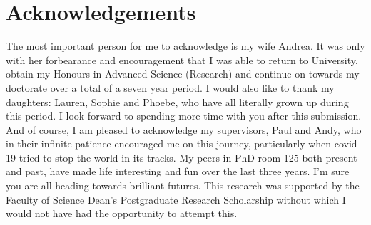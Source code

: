 \documentclass[../Thesis.tex]{subfiles}
\begin{document}
\chapter{Acknowledgements}


The most important person for me to acknowledge is my wife Andrea. 
It was only with her forbearance and encouragement that I was able to return to University, obtain my Honours in Advanced Science (Research) and continue on towards my doctorate over a total of a seven year period.
I would also like to thank my daughters: Lauren, Sophie and Phoebe, who have all literally grown up during this period.
I look forward to spending more time with you after this submission.
And of course, I am pleased to acknowledge my supervisors, Paul and Andy, who in their infinite patience encouraged me on this journey, particularly when covid-19 tried to stop the world in its tracks.
My peers in PhD room 125 both present and past, have made life interesting and fun over the last three years.
I'm sure you are all heading towards brilliant futures.
This research was supported by the Faculty of Science Dean's Postgraduate Research Scholarship without which I would not have had the opportunity to attempt this.
\end{document}
